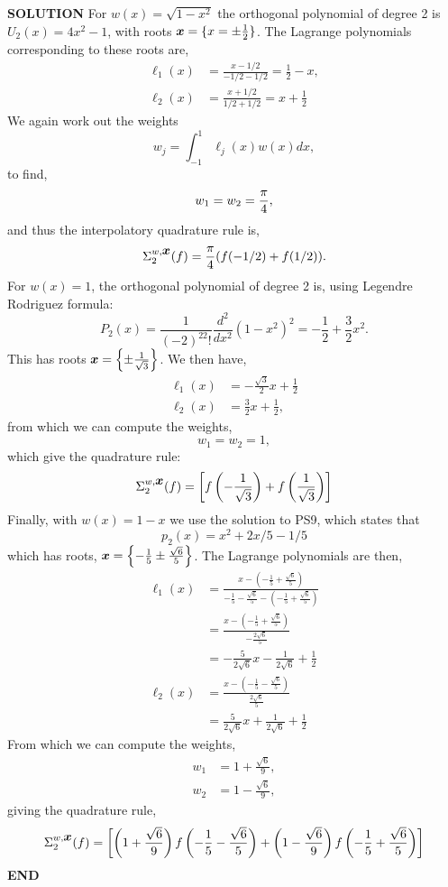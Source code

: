 \documentclass[12pt,a4paper]{article}
\def\x{ {\vc x} }
\begin{document}
\textbf{SOLUTION} For $w(x) = \sqrt{1-x^2}$ the orthogonal polynomial of degree 2 is $U_2(x) = 4x^2 -1$, with roots $\ensuremath{\bm{\x}} = \{x = \ensuremath{\pm} \frac{1}{2}\}$. The Lagrange polynomials corresponding to these roots are,
\begin{align*}
\ensuremath{\ell}_1(x) &= \frac{x - 1/2}{-1/2 - 1/2} = \frac{1}{2} - x, \\
\ensuremath{\ell}_2(x) &= \frac{x + 1/2}{1/2 + 1/2} = x + \frac{1}{2}
\end{align*}
We again work out the weights
\[
w_j = \int_{-1}^1 \ensuremath{\ell}_j(x)w(x)dx,
\]
to find,
\[
w_1 = w_2 = {\ensuremath{\pi} \over 4},
\]
and thus the interpolatory quadrature rule is,
\[
\ensuremath{\Sigma}_2^{w,\ensuremath{\bm{\x}}}(f) = \frac{\ensuremath{\pi}}{4}(f(-1/2) + f(1/2)).
\]
For $w(x) = 1$, the orthogonal polynomial of degree 2 is, using Legendre Rodriguez formula:
\[
P_2(x) = \frac{1}{(-2)^22!} \frac{d^2}{dx^2}\left(1 - x^2\right)^2 = -\frac{1}{2} + \frac{3}{2}x^2.
\]
This has roots $\ensuremath{\bm{\x}} = \left\{\ensuremath{\pm} \frac{1}{\sqrt{3}}\right\}$. We then have,
\begin{align*}
	\ensuremath{\ell}_1(x) &= -\frac{\sqrt{3}}{2}x + \frac{1}{2} \\
	\ensuremath{\ell}_2(x) &= \frac{3}{2}x + \frac{1}{2},
\end{align*}
from which we can compute the weights,
\[
w_1 = w_2 = 1,
\]
which give the quadrature rule:
\[
\ensuremath{\Sigma}_2^{w,\ensuremath{\bm{\x}}}(f) = \left[f\left(-\frac{1}{\sqrt{3}}\right) + f\left(\frac{1}{\sqrt{3}}\right)\right]
\]
Finally, with $w(x) = 1 - x$ we use the solution to PS9, which states that
\[
p_2(x) = x^2 + 2x/5 - 1/5
\]
which has roots, $\ensuremath{\bm{\x}} = \left\{-\frac{1}{5} \ensuremath{\pm} \frac{\sqrt{6}}{5} \right\}$. The Lagrange polynomials are then,
\begin{align*}
	\ensuremath{\ell}_1(x) &= \frac{x - (-\frac{1}{5} + \frac{\sqrt{6}}{5} )}{-\frac{1}{5} - \frac{\sqrt{6}}{5} - (-\frac{1}{5} + \frac{\sqrt{6}}{5}) } \\
	&= \frac{x - (-\frac{1}{5} + \frac{\sqrt{6}}{5} )}{-\frac{2\sqrt{6}}{5}} \\
	&=-\frac{5}{2\sqrt{6}}x - \frac{1}{2\sqrt{6}} + \frac{1}{2} \\
	\ensuremath{\ell}_2(x) &= \frac{x - (-\frac{1}{5} - \frac{\sqrt{6}}{5} )}{\frac{2\sqrt{6}}{5}} \\
	&= \frac{5}{2\sqrt{6}}x + \frac{1}{2\sqrt{6}} + \frac{1}{2}
\end{align*}
From which we can compute the weights,
\begin{align*}
	w_1 &= 1 + \frac{\sqrt{6}}{9}, \\
	w_2 &= 1 - \frac{\sqrt{6}}{9},
\end{align*}
giving the quadrature rule,
\[
\ensuremath{\Sigma}_2^{w,\ensuremath{\bm{\x}}}(f) = \left[\left(1 + \frac{\sqrt{6}}{9} \right)f\left(-\frac{1}{5} - \frac{\sqrt{6}}{5} \right) + \left(1 - \frac{\sqrt{6}}{9} \right)f\left(-\frac{1}{5} + \frac{\sqrt{6}}{5} \right) \right]
\]
\textbf{END}
\end{document}

